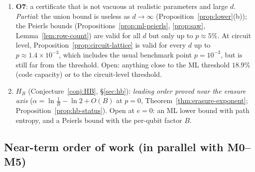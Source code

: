 \begin{enumerate}
\item \textbf{O7}: a certificate that is not vacuous at realistic parameters and large $d$. \emph{Partial}: the union bound is useless as $d\to\infty$ (Proposition~\ref{prop:lower}(b)); the Peierls bounds (Propositions~\ref{prop:ml-peierls}, \ref{prop:saw}, Lemma~\ref{lem:row-count}) are valid for all $d$ but only up to $p\approx5\%$. At circuit level, Proposition~\ref{prop:circuit-lattice} is valid for every $d$ up to $p\approx1.4\times10^{-3}$, which includes the usual benchmark point $p=10^{-3}$, but is still far from the threshold. Open: anything close to the ML threshold $18.9\%$ (code capacity) or to the circuit-level threshold.
\item \textbf{$H_B$} (Conjecture~\ref{conj:HB}, \S\ref{sec:hb}): \emph{leading order proved near the erasure axis} ($\alpha=\ln\frac1B-\ln2+O(B)$ at $p=0$, Theorem~\ref{thm:erasure-exponent}; Proposition~\ref{prop:hb-status}). Open at $e=0$: an ML lower bound with path entropy, and a Peierls bound with the per-qubit factor $B$.
\end{enumerate}

\subsection{Near-term order of work (in parallel with M0--M5)}

